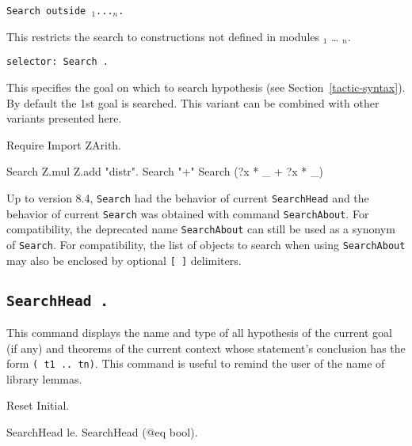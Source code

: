 \begin{Variants}
\item
  {\tt Search \nelist{{\termpatternorstr}}{}
     outside {\module$_1$}...{\module$_n$}.}

This restricts the search to constructions not defined in modules
{\module$_1$} \ldots{} {\module$_n$}.

\item {\tt selector: Search \nelist{\zeroone{-}{\termpatternorstr}}{}.}

  This specifies the goal on which to search hypothesis (see
  Section~\ref{tactic-syntax}). By default the 1st goal is searched.
  This variant can be combined with other variants presented here.
\end{Variants}

\examples

\begin{coq_example*}
Require Import ZArith.
\end{coq_example*}
\begin{coq_example}
Search Z.mul Z.add "distr".
Search "+"%
Search (?x * _ + ?x * _)%
\end{coq_example}

\Warning {} Up to {\Coq} version 8.4, {\tt Search}
had the behavior of current {\tt SearchHead} and the behavior of
current {\tt Search} was obtained with command {\tt SearchAbout}. For
compatibility, the deprecated name {\tt SearchAbout} can still be used
as a synonym of {\tt Search}. For compatibility, the list of objects to
search when using {\tt SearchAbout} may also be enclosed by optional
{\tt [ ]} delimiters.

\subsection[\tt SearchHead {\term}.]{\tt SearchHead {\term}.}
This command displays the name and type of all hypothesis of the
current goal (if any) and theorems of the current context whose
statement's conclusion has the form {\tt ({\term} t1 ..
  tn)}.  This command is useful to remind the user of the name of
library lemmas.

\begin{coq_eval}
Reset Initial.
\end{coq_eval}

\begin{coq_example}
SearchHead le.
SearchHead (@eq bool).
\end{coq_example}

